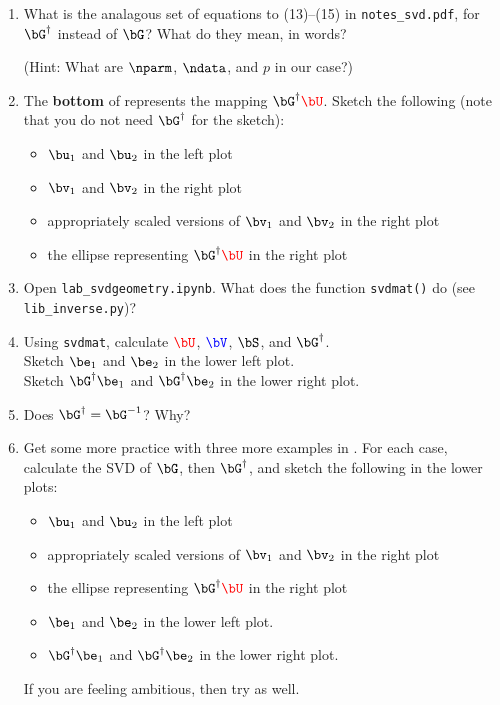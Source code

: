 \documentclass[11pt,titlepage,fleqn]{article}
\newcommand{\tfile}{{\tt lab\_svdgeometry.ipynb}}
\newcommand{\nfile}{{\tt notes\_svd.pdf}}
\begin{document}
\begin{enumerate}
\item What is the analagous set of equations to (13)--(15) in \nfile, for $\bG^{\dagger}$ instead of $\bG$? What do they mean, in words?

(Hint: What are $\nparm$, $\ndata$, and $p$ in our case?)

\item The {\bf bottom} of  represents the mapping $\bG^{\dagger}\Ucolor$. Sketch the following (note that you do not need $\bG^{\dagger}$ for the sketch):
%
\begin{itemize}
\item $\bu_1$ and $\bu_2$ in the left plot
\item $\bv_1$ and $\bv_2$ in the right plot
\item appropriately scaled versions of $\bv_1$ and $\bv_2$ in the right plot
\item the ellipse representing $\bG^{\dagger}\Ucolor$ in the right plot
\end{itemize}

\item Open \tfile. What does the function \verb+svdmat()+ do (see \verb+lib_inverse.py+)?

\item Using \verb+svdmat+, calculate $\Ucolor$, $\Vcolor$, $\bS$, and $\bG^{\dagger}$. \\
Sketch $\be_1$ and $\be_2$ in the lower left plot. \\
Sketch $\bG^{\dagger}\be_1$ and $\bG^{\dagger}\be_2$ in the lower right plot.

\item Does $\bG^{\dagger} = \bG^{-1}$? Why?

\item Get some more practice with three more examples in . For each case, calculate the SVD of $\bG$, then $\bG^{\dagger}$, and sketch the following in the lower plots:
%
%
\begin{itemize}
\item $\bu_1$ and $\bu_2$ in the left plot
\item appropriately scaled versions of $\bv_1$ and $\bv_2$ in the right plot
\item the ellipse representing $\bG^{\dagger}\Ucolor$ in the right plot
\item $\be_1$ and $\be_2$ in the lower left plot.
\item $\bG^{\dagger}\be_1$ and $\bG^{\dagger}\be_2$ in the lower right plot.
\end{itemize}
%
If you are feeling ambitious, then try  as well.


\end{enumerate}
\end{document}
